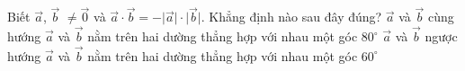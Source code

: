 \begin{ex}%
	Biết $\overrightarrow{a} $, $\overrightarrow{b} $ $\ne\overrightarrow{0} $ và $\overrightarrow{a} \cdot \overrightarrow{b}=-\big| \overrightarrow{a}\big| \cdot \big| \overrightarrow{b}\big| $. Khẳng định nào sau đây đúng?
	\choice
	{$\overrightarrow{a} $ và $\overrightarrow{b} $ cùng hướng}
	{$\overrightarrow{a} $ và $\overrightarrow{b} $ nằm trên hai dường thẳng hợp với nhau một góc $80^\circ $}
	{\True $\overrightarrow{a} $ và $\overrightarrow{b} $ ngược hướng}
	{$\overrightarrow{a} $ và $\overrightarrow{b} $ nằm trên hai dường thẳng hợp với nhau một góc $60^\circ $}
\end{ex}

